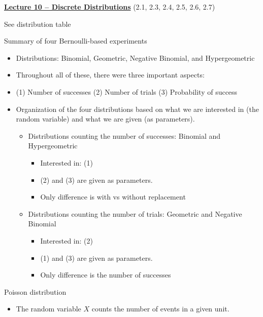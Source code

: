 \documentclass{article}
\newcommand{\bu}[1]{\textbf{\ul{#1}}}				%
\begin{document}
\vspace{60pt}


{\large \bu{Lecture 10 -- Discrete Distributions}} (2.1, 2.3, 2.4, 2.5, 2.6, 2.7)\bigskip

See distribution table\bigskip

Summary of four Bernoulli-based experiments
\begin{itemize}
    \item Distributions: Binomial, Geometric, Negative Binomial, and Hypergeometric
    \item Throughout all of these, there were three important aspects:
    \item[] (1) Number of successes \hfill (2)  Number of trials \hfill (3) Probability of success
    \item Organization of the four distributions based on what we are interested in (the random variable) and what we are given (as parameters).
    \begin{itemize}
        \item Distributions counting the number of successes: Binomial and Hypergeometric
        \begin{itemize}
            \item Interested in: (1)
            \item (2) and (3) are given as parameters.
            \item Only difference is with vs without replacement
        \end{itemize}
        \item Distributions counting the number of trials: Geometric and Negative Binomial
        \begin{itemize}
            \item Interested in: (2)
            \item (1) and (3) are given as parameters.
            \item Only difference is the number of successes
        \end{itemize}
    \end{itemize}
\end{itemize}\bigskip

Poisson distribution
\begin{itemize}
    \item The random variable $X$ counts the number of events in a given unit.
\end{itemize}

\vspace{50pt}
\end{document}
